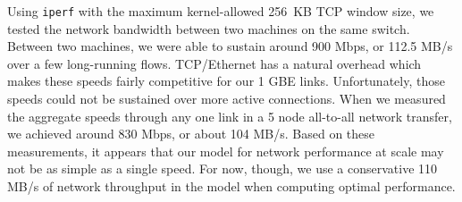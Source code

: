 Using \texttt{iperf} with the maximum kernel-allowed 256~KB TCP
window size, we tested the network bandwidth between two machines on
the same switch.  Between two machines, we were able to sustain around
900 Mbps, or 112.5 MB/s over a few long-running flows.  TCP/Ethernet
has a natural overhead which makes these speeds fairly competitive for
our 1 GBE links.  Unfortunately, those speeds could not be sustained
over more active connections.  When we measured the aggregate speeds
through any one link in a 5 node all-to-all network transfer, we
achieved around 830 Mbps, or about 104 MB/s.  Based on these
measurements, it appears that our model for network performance at
scale may not be as simple as a single speed.  For now, though, we use
a conservative 110 MB/s of network throughput in the model when
computing optimal performance.
